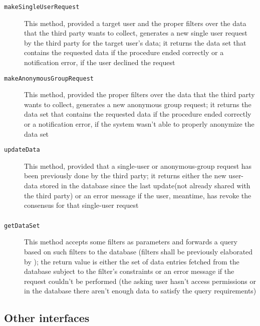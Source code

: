 \documentclass[../DD0.tex]{subfiles}
\begin{document}
    \subsubsection{\RequestManager}

      \begin{description}
        \item[\texttt{makeSingleUserRequest}] This method, provided a target user and the proper filters over the data that the third party wants to collect, generates a new single user request by the third party for the target user's data; it returns the data set that contains the requested data if the procedure ended correctly or a notification error, if the user declined the request
        \item[\texttt{makeAnonymousGroupRequest}] This method, provided the proper filters over the data that the third party wants to collect, generates a new anonymous group request; it returns the data set that contains the requested data if the procedure ended correctly or a notification error, if the system wasn't able to properly anonymize the data set
        \item[\texttt{updateData}]  This method, provided that a single-user or anonymous-group request has been previously done by the third party; it returns either the new user-data stored in the database since the last update(not already shared with the third party) or an error message if the user, meantime, has revoke the consensus for that single-user request
      \end{description}

    \subsubsection{\SetBuilder}

      \begin{description}
        \item[\texttt{getDataSet}] This method accepts some filters as parameters and forwards a query based on such filters to the database (filters shall be previously elaborated by \FilterManager); the return value is either the set of data entries fetched from the database subject to the filter's constraints or an error message if the \FilterManager request couldn't be performed (the asking user hasn't access permissions or in the database there aren't enough data to satisfy the query requirements)
      \end{description}

  \subsection{Other interfaces}
  \label{sec:otherinterfaces}
\end{document}
